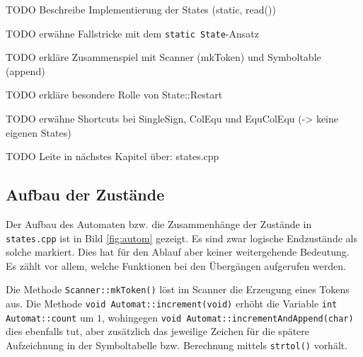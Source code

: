 \documentclass[
a4paper,   %
11pt,      %
oneside,   %
onecolumn, %
final      %
]{article}
\newcommand{\code}[1]{\lstinline$#1$}
\begin{document}
TODO Beschreibe Implementierung der States (static, read())

TODO erwähne Fallstricke mit dem \code{static State}-Ansatz

TODO erkläre Zusammenspiel mit Scanner (mkToken) und Symboltable (append)

TODO erkläre besondere Rolle von State::Restart

TODO erwähne Shortcuts bei SingleSign, ColEqu und EquColEqu (-> keine eigenen States)

TODO Leite in nächstes Kapitel über: states.cpp

\subsection{Aufbau der Zustände}

Der Aufbau des Automaten bzw. die Zusammenhänge der Zustände in \texttt{states.cpp} ist in Bild \ref{fig:autom} gezeigt. Es sind zwar logische Endzustände als solche markiert. Dies hat für den Ablauf aber keiner weitergehende Bedeutung. Es zählt vor allem, welche Funktionen bei den Übergängen aufgerufen werden.

Die Methode \code{Scanner::mkToken()} löst im Scanner die Erzeugung eines Tokens aus. Die Methode \code{void Automat::increment(void)} erhöht die Variable \code{int Automat::count} um $1$, wohingegen \code{void Automat::incrementAndAppend(char)} dies ebenfalls tut, aber zusätzlich das jeweilige Zeichen für die spätere Aufzeichnung in der Symboltabelle bzw. Berechnung mittels \code{strtol()} vorhält.
\end{document}
